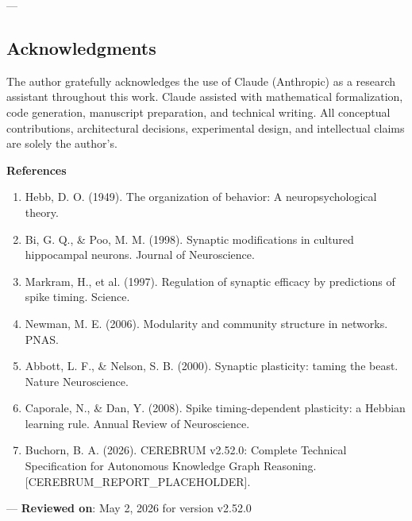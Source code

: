 ---
\subsection{Acknow\-ledgments}

The author gratefully ackno\-wledges the use of Claude (Anthropic) as a research assistant throughout this work. Claude assisted with mathe\-matical forma\-lization, code generation, manuscript preparation, and technical writing. All conceptual contr\-ibutions, archi\-tectural decisions, exper\-imental design, and intel\-lectual claims are solely the author's.

\textbf{References}
\begin{enumerate}
\item Hebb, D. O. (1949). The organ\-ization of behavior: A neuro\-psychological theory.
\item Bi, G. Q., \& Poo, M. M. (1998). Synaptic modif\-ications in cultured hippocampal neurons. Journal of Neuros\-cience.
\item Markram, H., et al. (1997). Regulation of synaptic efficacy by predictions of spike timing. Science.
\item Newman, M. E. (2006). Modularity and community structure in networks. PNAS.
\item Abbott, L. F., \& Nelson, S. B. (2000). Synaptic plasticity: taming the beast. Nature Neuros\-cience.
\item Caporale, N., \& Dan, Y. (2008). Spike timing-dependent plasticity: a Hebbian learning rule. Annual Review of Neuros\-cience.
\item Buchorn, B. A. (2026). CEREBRUM v2.52.0: Complete Technical Specif\-ication for Autonomous Knowledge Graph Reasoning. [CEREBRUM\_REPORT\_PLACEHOLDER].

\end{enumerate}
---
\textbf{Reviewed on}: May 2, 2026 for version v2.52.0
